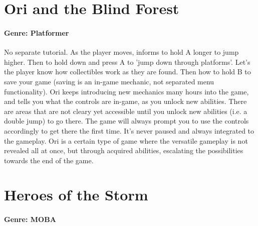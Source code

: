 \section{Ori and the Blind Forest}
\paragraph{Genre: Platformer}

No separate tutorial.
As the player moves, informs to hold A longer to jump higher.
Then to hold down and press A to 'jump down through platforms'.
Let's the player know how collectibles work as they are found.
Then how to hold B to save your game (saving is an in-game mechanic, not separated menu functionality).
Ori keeps introducing new mechanics many hours into the game, and tells you what the controls are in-game, as you unlock new abilities.
There are areas that are not cleary yet accessible until you unlock new abilities (i.e. a double jump) to go there. The game will always prompt you to use the controls accordingly to get there the first time. It's never paused and always integrated to the gameplay.
Ori is a certain type of game where the versatile gameplay is not revealed all at once, but through acquired abilities, escalating the possibilities towards the end of the game.

\section{Heroes of the Storm}
\paragraph{Genre: MOBA}

